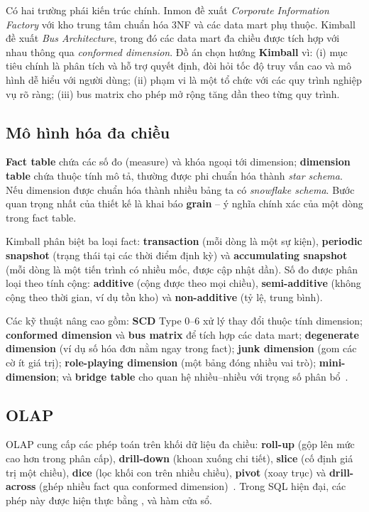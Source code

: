 \documentclass[a4paper]{article}
\DeclareRobustCommand{\code}[1]{\texttt{\detokenize{#1}}}
\begin{document}
Có hai trường phái kiến trúc chính. Inmon đề xuất \textit{Corporate Information Factory} với kho trung tâm chuẩn hóa 3NF và các data mart phụ thuộc. Kimball~\cite{kimball2013} đề xuất \textit{Bus Architecture}, trong đó các data mart đa chiều được tích hợp với nhau thông qua \textit{conformed dimension}. Đồ án chọn hướng \textbf{Kimball} vì: (i) mục tiêu chính là phân tích và hỗ trợ quyết định, đòi hỏi tốc độ truy vấn cao và mô hình dễ hiểu với người dùng; (ii) phạm vi là một tổ chức với các quy trình nghiệp vụ rõ ràng; (iii) bus matrix cho phép mở rộng tăng dần theo từng quy trình.

\subsection{Mô hình hóa đa chiều}
\textbf{Fact table} chứa các số đo (measure) và khóa ngoại tới dimension; \textbf{dimension table} chứa thuộc tính mô tả, thường được phi chuẩn hóa thành \textit{star schema}. Nếu dimension được chuẩn hóa thành nhiều bảng ta có \textit{snowflake schema}. Bước quan trọng nhất của thiết kế là khai báo \textbf{grain} -- ý nghĩa chính xác của một dòng trong fact table.

Kimball phân biệt ba loại fact: \textbf{transaction} (mỗi dòng là một sự kiện), \textbf{periodic snapshot} (trạng thái tại các thời điểm định kỳ) và \textbf{accumulating snapshot} (mỗi dòng là một tiến trình có nhiều mốc, được cập nhật dần). Số đo được phân loại theo tính cộng: \textbf{additive} (cộng được theo mọi chiều), \textbf{semi-additive} (không cộng theo thời gian, ví dụ tồn kho) và \textbf{non-additive} (tỷ lệ, trung bình).

Các kỹ thuật nâng cao gồm: \textbf{SCD} Type 0--6 xử lý thay đổi thuộc tính dimension; \textbf{conformed dimension} và \textbf{bus matrix} để tích hợp các data mart; \textbf{degenerate dimension} (ví dụ số hóa đơn nằm ngay trong fact); \textbf{junk dimension} (gom các cờ ít giá trị); \textbf{role-playing dimension} (một bảng đóng nhiều vai trò); \textbf{mini-dimension}; và \textbf{bridge table} cho quan hệ nhiều--nhiều với trọng số phân bổ~\cite{kimball2013, thai2026}.

\subsection{OLAP}
OLAP cung cấp các phép toán trên khối dữ liệu đa chiều: \textbf{roll-up} (gộp lên mức cao hơn trong phân cấp), \textbf{drill-down} (khoan xuống chi tiết), \textbf{slice} (cố định giá trị một chiều), \textbf{dice} (lọc khối con trên nhiều chiều), \textbf{pivot} (xoay trục) và \textbf{drill-across} (ghép nhiều fact qua conformed dimension)~\cite{han2012}. Trong SQL hiện đại, các phép này được hiện thực bằng \code{GROUP BY ROLLUP/CUBE/GROUPING SETS}, \code{PIVOT} và hàm cửa sổ.
\end{document}
